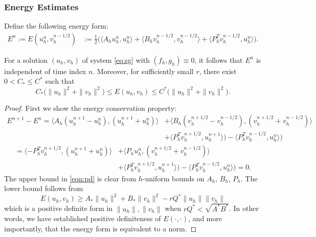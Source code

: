 \subsubsection{Energy Estimates}

Define the following energy form:
\begin{equation*}
\begin{split}
	E^n := E(u_h^n,v_h^{n-1/2}) &:= \frac{1}{2} \Big( \langle A_h u_h^n,u_h^n\rangle + 
				       \langle B_hv_h^{n-1/2},v_h^{n-1/2}\rangle +
				       \langle P^T_h v_h^{n-1/2},u_h^n\rangle \Big).
\end{split}
\end{equation*}

\begin{theorem}
For a solution $(u_h,v_h)$ of system \ref{eq:sg} with $(f_h, g_h)\equiv 0$, it follows that $E^n$ is independent of time index $n$.
Moreover, for sufficiently small $r$, there exist $0 < C_* \le C^*$ such that 
\begin{equation}
\label{eqn:pd}
	C_* \Big( \|u_h\|^2 + \|v_h\|^2 \Big) \le E(u_h,v_h) \le C^*\Big( \|u_h\|^2 +\|v_h\|^2 \Big).
\end{equation}
\end{theorem}

\begin{proof}
First we show the energy conservation property:
\begin{equation*}
\begin{split}
	E^{n+1} - E^n =\langle A_h( u^{n+1}_h-u^n_h ), (u^{n+1}_h+u^n_h)\rangle 
		&+ \langle B_h( v^{n+1/2}_h-v^{n-1/2}_h ), (v^{n+1/2}_h+v^{n-1/2}_h)\rangle \\
		&+ \langle P_h^T v^{n+1/2}_h, u^{n+1}_h\rangle ) - \langle P_h^T v^{n-1/2}_h, u^n_h\rangle )
\end{split}
\end{equation*}
\begin{equation*}
\begin{split}
	= \langle -P_h^Tv^{n+1/2}_h,(u^{n+1}_h+u^n_h) \rangle 
		&+ \langle P_hu^n_h, (v^{n+1/2}_h+v^{n-1/2}_h) \rangle\\
		&+\langle P_h^Tv^{n+1/2}_h,u^{n+1}_h\rangle ) - \langle P^T_h v^{n-1/2}_h,u^n_h\rangle )
	=0.
\end{split}
\end{equation*}
The upper bound in \ref{eqn:pd} is clear from $h$-uniform bounds on $A_h$, $B_h$,
$P_h$. 
The lower bound follows from
\[
	E(u_h,v_h) \ge A_*\|u_h\|^2 + B_*\|v_h\|^2 - rQ^*\|u_h\|\|v_h\|
\]
which is a positive definite form in $\|u_h\|,\|v_h\|$ when $rQ^* <\sqrt{A^*B^*}$.
In other words, we have established positive definiteness of $E(\cdot,\cdot)$, and more importantly, that the energy form is equivalent to a norm.
\end{proof}

